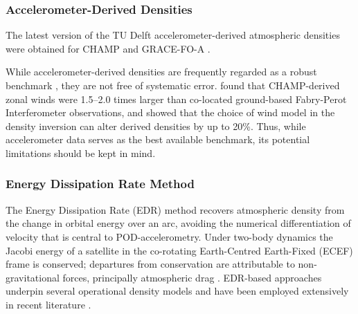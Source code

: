 \documentclass[draft]{agujournal2019}
\begin{document}
\subsubsection{Accelerometer-Derived Densities}

The latest version of the TU Delft accelerometer-derived atmospheric densities were obtained for CHAMP and GRACE-FO-A \cite{Siemes2023NewGRACE-FO}.

While accelerometer-derived densities are frequently regarded as a robust benchmark \cite{Sutton2021TowardSatellites, Mehta2022SatelliteOperations, Mutschler2023Physics-BasedData}, they are not free of systematic error.  found that CHAMP-derived zonal winds were 1.5--2.0 times larger than co-located ground-based Fabry-Perot Interferometer observations, and  showed that the choice of wind model in the density inversion can alter derived densities by up to 20\%. Thus, while accelerometer data serves as the best available benchmark, its potential limitations should be kept in mind.

\subsubsection{Energy Dissipation Rate Method}
\label{sec:edr-method}

The Energy Dissipation Rate (EDR) method recovers atmospheric density from
the change in orbital energy over an arc, avoiding the numerical
differentiation of velocity that is central to POD-accelerometry. Under
two-body dynamics the Jacobi energy of a satellite in the co-rotating
Earth-Centred Earth-Fixed (ECEF) frame is conserved; departures from conservation are attributable to
non-gravitational forces, principally atmospheric drag
\cite{Picone2005ThermosphericSets, King-Hele1987TheLifetimes}. EDR-based
approaches underpin several operational density models
\cite{Storz2002HASDMRates, Bowman2003HighReview} and have been employed
extensively in recent literature
\cite{Hejduk2013ASolutions, Pilinski2016ImprovedSpecification,
Sutton2021TowardSatellites}.
\end{document}
